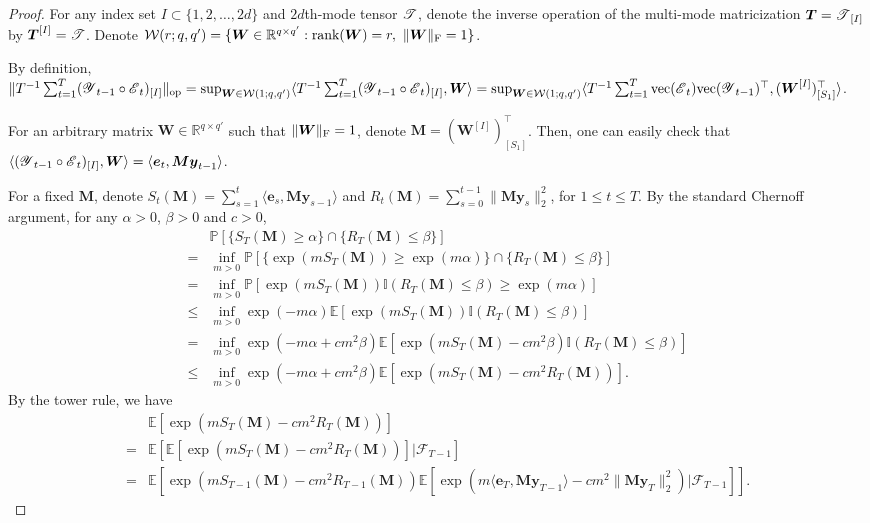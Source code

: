 \documentclass[12pt]{article}
\newcommand{\bm}{\boldsymbol}
\newcommand{\cm}[1]{\mbox{\boldmath$\mathscr{#1}$}}
\begin{document}
\begin{proof}
	For any index set $I\subset\{1,2,\dots,2d\}$ and $2d$th-mode tensor $\cm{T}$, denote the inverse operation of the multi-mode matricization $\bm{T}=\cm{T}_{[I]}$ by $\bm{T}^{[I]}=\cm{T}$. Denote $\mathcal{W}(r;q,q')=\{\bm{W}\in\mathbb{R}^{q\times q'}:\textup{rank}(\bm{W})=r,~\|\bm{W}\|_\textup{F}=1\}$.
	
	By definition, $\|T^{-1}\sum_{t=1}^T(\cm{Y}_{t-1}\circ\cm{E}_t)_{[I]}\|_{\textup{op}}=\sup_{\bm{W}\in\mathcal{W}(1;q,q')}\langle T^{-1}\sum_{t=1}^T(\cm{Y}_{t-1}\circ\cm{E}_t)_{[I]},\bm{W}\rangle=\sup_{\bm{W}\in\mathcal{W}(1;q,q')}\langle T^{-1}\sum_{t=1}^T\textup{vec}(\cm{E}_{t})\textup{vec}(\cm{Y}_{t-1})^\top,(\bm{W}^{[I]})_{[S_1]}^\top\rangle$.
	
	For an arbitrary matrix $\bm{W}\in\mathbb{R}^{q\times q'}$ such that $\|\bm{W}\|_\textup{F}=1$, denote $\bm{M}=(\bm{W}^{[I]})_{[S_1]}^\top$. Then, one can easily check that $\langle(\cm{Y}_{t-1}\circ\cm{E}_t)_{[I]},\bm{W}\rangle=\langle \bm{e}_t,\bm{M}\bm{y}_{t-1}\rangle$.
	
	For a fixed $\bm{M}$, denote $S_t(\bm{M})=\sum_{s=1}^t\langle\bm{e}_s,\bm{M}\bm{y}_{s-1}\rangle$ and $R_t(\bm{M})=\sum_{s=0}^{t-1}\|\bm{M}\bm{y}_s\|_2^2$, for $1\leq t\leq T$. By the standard Chernoff argument, for any $\alpha>0$, $\beta>0$ and $c>0$,
	\begin{equation}
	\begin{split}
	&\mathbb{P}[\{S_T(\bm{M})\geq\alpha\}\cap\{R_T(\bm{M})\leq\beta\}]\\
	=&\inf_{m>0}\mathbb{P}[\{\exp(m S_T(\bm{M}))\geq\exp(m\alpha)\}\cap\{R_T(\bm{M})\leq\beta\}]\\
	=&\inf_{m>0}\mathbb{P}[\exp(m S_T(\bm{M}))\mathbb{I}(R_T(\bm{M})\leq\beta)\geq\exp(m\alpha)]\\
	\leq&\inf_{m>0}\exp(-m\alpha)\mathbb{E}[\exp(m S_T(\bm{M}))\mathbb{I}(R_T(\bm{M})\leq\beta)]\\
	=&\inf_{m>0}\exp(-m\alpha+cm^2\beta)\mathbb{E}[\exp(m S_T(\bm{M})-cm^2\beta)\mathbb{I}(R_T(\bm{M})\leq\beta)]\\
	\leq&\inf_{m>0}\exp(-m\alpha+cm^2\beta)\mathbb{E}[\exp(m S_T(\bm{M})-cm^2R_T(\bm{M}))].
	\end{split}
	\end{equation}
	By the tower rule, we have
	\begin{equation}
	\begin{split}
	&\mathbb{E}[\exp(mS_T(\bm{M})-cm^2R_T(\bm{M}))]\\
	=&\mathbb{E}[\mathbb{E}[\exp(m S_T(\bm{M})-cm^2R_T(\bm{M}))]|\mathcal{F}_{T-1}]\\
	=&\mathbb{E}[\exp(m S_{T-1}(\bm{M})-cm^2R_{T-1}(\bm{M}))\mathbb{E}[\exp(m\langle\bm{e}_T,\bm{M}\bm{y}_{T-1}\rangle-cm^2\|\bm{M}\bm{y}_T\|_2^2)|\mathcal{F}_{T-1}]].
	\end{split}
	\end{equation}
	

\end{proof}
\end{document}
